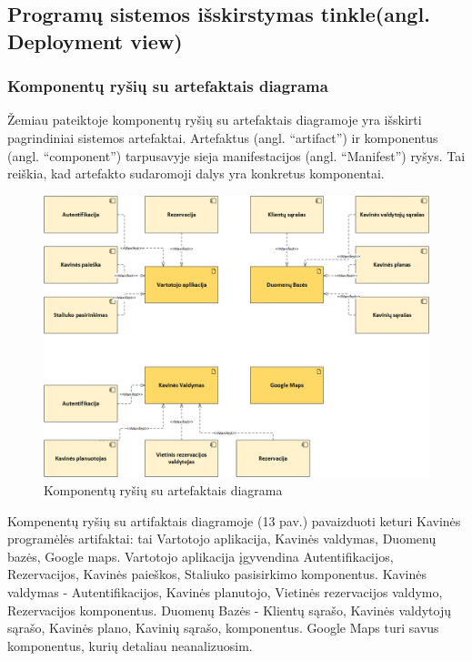 \documentclass{VUMIFPSkursinis}
\begin{document}
\subsection{Programų sistemos išskirstymas tinkle(angl. Deployment view)}
\subsubsection{Komponentų ryšių su artefaktais diagrama}

Žemiau pateiktoje komponentų ryšių su artefaktais diagramoje yra išskirti pagrindiniai sistemos artefaktai. Artefaktus (angl. “artifact”) ir komponentus (angl. “component”) tarpusavyje sieja manifestacijos (angl. “Manifest”) ryšys. Tai reiškia, kad artefakto sudaromoji dalys yra konkretus komponentai.


\begin{figure}[H]
    \centering
    \includegraphics[width=\textwidth,height=\textheight,keepaspectratio]{img/Deployment_diagram1} 
    \caption{Komponentų ryšių su artefaktais diagrama}
    \label{img:Model}
\end{figure}

Kompenentų ryšių su artifaktais diagramoje (13 pav.) pavaizduoti keturi Kavinės programėlės artifaktai: tai Vartotojo aplikacija, Kavinės valdymas, Duomenų bazės, Google maps. Vartotojo aplikacija įgyvendina Autentifikacijos, Rezervacijos, Kavinės paieškos, Staliuko pasisirkimo komponentus. Kavinės valdymas - 
Autentifikacijos, Kavinės planutojo, Vietinės rezervacijos valdymo, Rezervacijos komponentus. Duomenų Bazės - Klientų sąrašo, Kavinės valdytojų sąrašo, Kavinės plano, Kavinių sąrašo, komponentus. Google Maps turi savus komponentus, kurių detaliau neanalizuosim.
\end{document}
